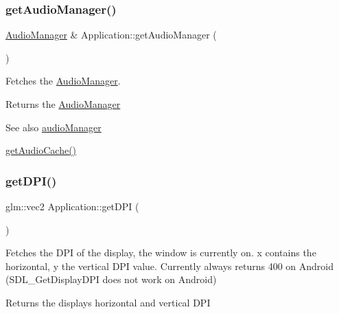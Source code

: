 \subsubsection{\texorpdfstring{getAudioManager()}{getAudioManager()}}
{\footnotesize\ttfamily \mbox{\hyperlink{classsage_1_1AudioManager}{Audio\+Manager}} \& Application\+::get\+Audio\+Manager (\begin{DoxyParamCaption}{ }\end{DoxyParamCaption})}



Fetches the \mbox{\hyperlink{classsage_1_1AudioManager}{Audio\+Manager}}. 

\begin{DoxyReturn}{Returns}
the \mbox{\hyperlink{classsage_1_1AudioManager}{Audio\+Manager}} 
\end{DoxyReturn}
\begin{DoxySeeAlso}{See also}
\mbox{\hyperlink{classsage_1_1Application_ac581d8db2c28c51373d3eae40e816620}{audio\+Manager}} 

\mbox{\hyperlink{classsage_1_1Application_a68d5ca5d6fd24fa3ec8354e8ec62227a}{get\+Audio\+Cache()}} 
\end{DoxySeeAlso}
\mbox{\label{classsage_1_1Application_a452bc916f132e0997a02de53d49364d3}} 
\subsubsection{\texorpdfstring{getDPI()}{getDPI()}}
{\footnotesize\ttfamily glm\+::vec2 Application\+::get\+D\+PI (\begin{DoxyParamCaption}{ }\end{DoxyParamCaption})}



Fetches the D\+PI of the display, the window is currently on. x contains the horizontal, y the vertical D\+PI value. Currently always returns 400 on Android (S\+D\+L\+\_\+\+Get\+Display\+D\+PI does not work on Android) 

\begin{DoxyReturn}{Returns}
the displays horizontal and vertical D\+PI 
\end{DoxyReturn}
\mbox{\label{classsage_1_1Application_abdc4b687788236f83fbb879465d80efe}} 
